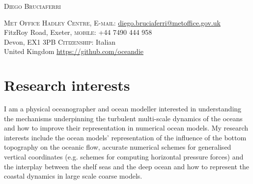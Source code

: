\documentclass[a4paper, oneside, final]{scrartcl}
\newcommand\YUGE{\fontsize{30}{60}\selectfont}
\begin{document}

\begin{center}
\YUGE \textsc{Diego Bruciaferri}\\
\end{center}
\bigskip%
\textsc{Met Office Hadley Centre}, \hspace{3.2cm} \textsc{E-mail}: \href{mailto:diego.bruciaferri@metoffice.gov.uk}{diego.bruciaferri@metoffice.gov.uk}\\
FitzRoy Road, Exeter, \hspace{7.5cm} \textsc{mobile}: +44 7490 444 958\\
Devon, EX1 3PB \hspace{9.4cm} \textsc{Citizenship}: Italian\\
United Kingdom \hspace{7.6cm} \url{https://github.com/oceandie}\\

\section{Research interests}
\normalsize
\noindent
I am a physical oceanographer and ocean modeller interested in understanding the mechanisms underpinning the turbulent multi-scale dynamics of the oceans and how to improve their representation in numerical ocean models. My research interests include the ocean models' representation of the influence of the bottom topography on the oceanic flow, accurate numerical schemes for generalised vertical coordinates (e.g. schemes for computing horizontal pressure forces) and the interplay between the shelf seas and the deep ocean and how to represent the coastal dynamics in large scale coarse models.
\end{document}
